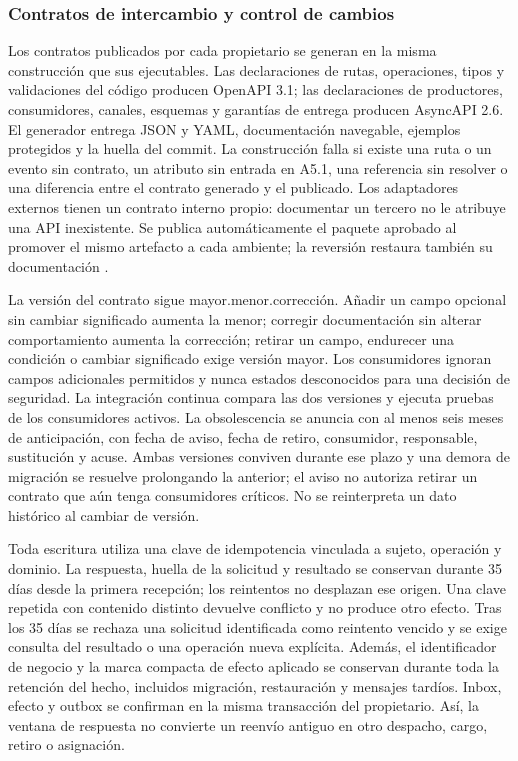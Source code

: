 \subsubsection{Contratos de intercambio y control de cambios}
\label{subsec:sd5_contratos_cierre}

Los contratos publicados por cada propietario se generan en la misma construcción que sus ejecutables. Las declaraciones de rutas, operaciones, tipos y validaciones del código producen OpenAPI 3.1; las declaraciones de productores, consumidores, canales, esquemas y garantías de entrega producen AsyncAPI 2.6. El generador entrega JSON y YAML, documentación navegable, ejemplos protegidos y la huella del commit. La construcción falla si existe una ruta o un evento sin contrato, un atributo sin entrada en A5.1, una referencia sin resolver o una diferencia entre el contrato generado y el publicado. Los adaptadores externos tienen un contrato interno propio: documentar un tercero no le atribuye una API inexistente. Se publica automáticamente el paquete aprobado al promover el mismo artefacto a cada ambiente; la reversión restaura también su documentación \parencite[RT-05.16--17]{bases-transversales}.

La versión del contrato sigue mayor.menor.corrección. Añadir un campo opcional sin cambiar significado aumenta la menor; corregir documentación sin alterar comportamiento aumenta la corrección; retirar un campo, endurecer una condición o cambiar significado exige versión mayor. Los consumidores ignoran campos adicionales permitidos y nunca estados desconocidos para una decisión de seguridad. La integración continua compara las dos versiones y ejecuta pruebas de los consumidores activos. La obsolescencia se anuncia con al menos seis meses de anticipación, con fecha de aviso, fecha de retiro, consumidor, responsable, sustitución y acuse. Ambas versiones conviven durante ese plazo y una demora de migración se resuelve prolongando la anterior; el aviso no autoriza retirar un contrato que aún tenga consumidores críticos. No se reinterpreta un dato histórico al cambiar de versión.

Toda escritura utiliza una clave de idempotencia vinculada a sujeto, operación y dominio. La respuesta, huella de la solicitud y resultado se conservan durante 35 días desde la primera recepción; los reintentos no desplazan ese origen. Una clave repetida con contenido distinto devuelve conflicto y no produce otro efecto. Tras los 35 días se rechaza una solicitud identificada como reintento vencido y se exige consulta del resultado o una operación nueva explícita. Además, el identificador de negocio y la marca compacta de efecto aplicado se conservan durante toda la retención del hecho, incluidos migración, restauración y mensajes tardíos. Inbox, efecto y outbox se confirman en la misma transacción del propietario. Así, la ventana de respuesta no convierte un reenvío antiguo en otro despacho, cargo, retiro o asignación.


